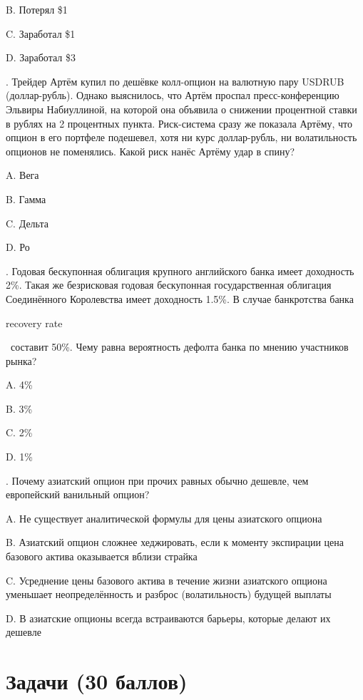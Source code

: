 \documentclass[a4paper,14pt]{extarticle}
\newcommand{\en}[1]{\begin{otherlanguage}{english}#1\end{otherlanguage}}
\begin{document}
B. Потерял \$1

C. Заработал \$1

D. Заработал \$3

\vspace{\baselineskip}

. Трейдер Артём купил по дешёвке колл-опцион на валютную пару USDRUB (доллар-рубль). Однако выяснилось, что Артём проспал пресс-конференцию Эльвиры Набиуллиной, на которой она объявила о снижении процентной ставки в рублях на 2 процентных пункта. Риск-система сразу же показала Артёму, что опцион в его портфеле подешевел, хотя ни курс доллар-рубль, ни волатильность опционов не поменялись. Какой риск нанёс Артёму удар в спину?

A. Вега

B. Гамма

C. Дельта

D. Ро

\vspace{\baselineskip}

. Годовая бескупонная облигация крупного английского банка имеет доходность 2\%. Такая же безрисковая годовая бескупонная государственная облигация Соединённого Королевства имеет доходность 1.5\%. В случае банкротства банка \en{recovery rate}\ составит 50\%. Чему равна вероятность дефолта банка по мнению участников рынка?

A. 4\%

B. 3\%

C. 2\%

D. 1\%

\vspace{\baselineskip}

. Почему азиатский опцион при прочих равных обычно дешевле, чем европейский ванильный опцион?

A. Не существует аналитической формулы для цены азиатского опциона

B. Азиатский опцион сложнее хеджировать, если к моменту экспирации цена базового актива оказывается вблизи страйка

C. Усреднение цены базового актива в течение жизни азиатского опциона уменьшает неопределённость и разброс (волатильность) будущей выплаты

D. В азиатские опционы всегда встраиваются барьеры, которые делают их дешевле

\section{Задачи (30 баллов)} 
\end{document}
